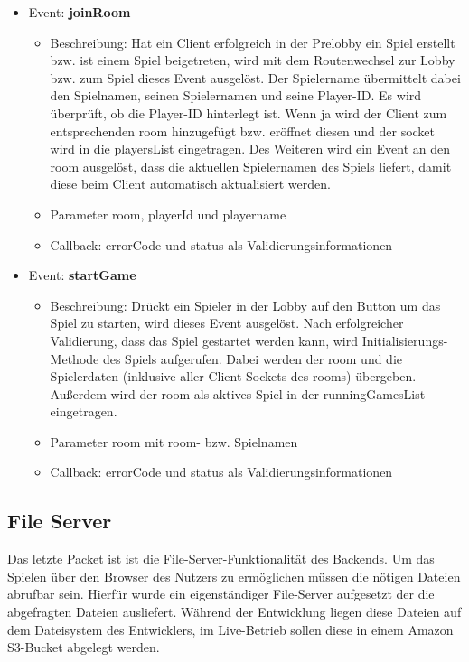 \documentclass[conference]{IEEEtran}
\begin{document}
\begin{itemize}
\item Event: \textbf{joinRoom}
\begin{itemize}
\item Beschreibung: Hat ein Client erfolgreich in der Prelobby ein Spiel erstellt bzw. ist einem Spiel beigetreten, wird mit dem Routenwechsel zur Lobby bzw. zum Spiel dieses Event ausgelöst.
Der Spielername übermittelt dabei den Spielnamen, seinen Spielernamen und seine Player-ID. Es wird überprüft, ob die Player-ID hinterlegt ist. Wenn ja wird der Client zum entsprechenden room hinzugefügt bzw. eröffnet diesen und der socket wird in die playersList eingetragen. Des Weiteren wird ein Event an den room ausgelöst, dass die aktuellen Spielernamen des Spiels liefert, damit diese beim Client automatisch aktualisiert werden.
\item Parameter \glqq room\grqq{}, \glqq playerId\grqq{} und \glqq playername\grqq{} 
\item Callback: \glqq errorCode\grqq{} und \glqq status\grqq{} als Validierungsinformationen
\end{itemize}

\item Event: \textbf{startGame}
\begin{itemize}
\item Beschreibung: Drückt ein Spieler in der Lobby auf den Button um das Spiel zu starten, wird dieses Event ausgelöst. Nach erfolgreicher Validierung, dass das Spiel gestartet werden kann, wird Initialisierungs-Methode des Spiels aufgerufen. Dabei werden der room und die Spielerdaten (inklusive aller Client-Sockets des rooms) übergeben.
Außerdem wird der room als aktives Spiel in der runningGamesList eingetragen.
\item Parameter \glqq room\grqq{} mit room- bzw. Spielnamen 
\item Callback: \glqq errorCode\grqq{} und \glqq status\grqq{} als Validierungsinformationen
\end{itemize}

\end{itemize}


\subsection{File Server}
Das letzte Packet ist ist die File-Server-Funktionalität des Backends. Um das Spielen über den Browser des Nutzers zu ermöglichen müssen die nötigen Dateien abrufbar sein. Hierfür wurde ein eigenständiger File-Server aufgesetzt der die abgefragten Dateien ausliefert. Während der Entwicklung liegen diese Dateien auf dem Dateisystem des Entwicklers, im Live-Betrieb sollen diese in einem Amazon S3-Bucket abgelegt werden.
\end{document}
